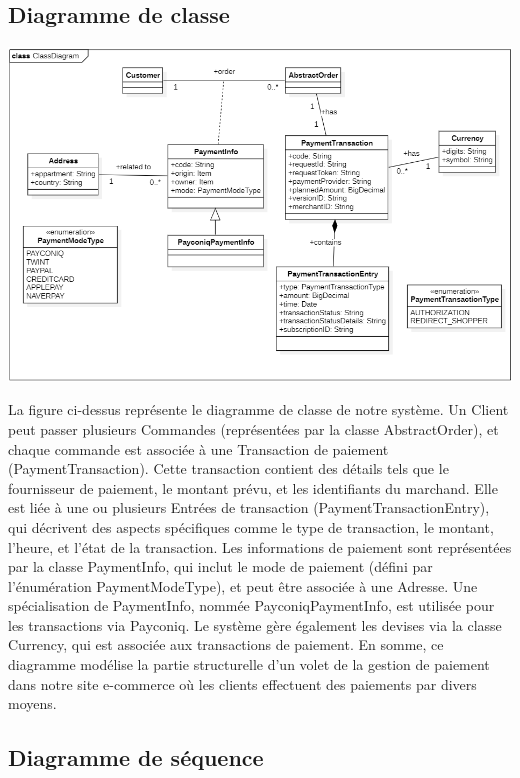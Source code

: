 \subsection{Diagramme de classe}
\begin{center}
    \centering
    \includegraphics[width=19cm]{Figures/class.png}
\end{center}

La figure ci-dessus représente le diagramme de classe de notre système. Un Client peut passer plusieurs Commandes (représentées par la classe AbstractOrder), et chaque commande est associée à une Transaction de paiement (PaymentTransaction). Cette transaction contient des détails tels que le fournisseur de paiement, le montant prévu, et les identifiants du marchand. Elle est liée à une ou plusieurs Entrées de transaction (PaymentTransactionEntry), qui décrivent des aspects spécifiques comme le type de transaction, le montant, l'heure, et l'état de la transaction. Les informations de paiement sont représentées par la classe PaymentInfo, qui inclut le mode de paiement (défini par l'énumération PaymentModeType), et peut être associée à une Adresse. Une spécialisation de PaymentInfo, nommée PayconiqPaymentInfo, est utilisée pour les transactions via Payconiq. Le système gère également les devises via la classe Currency, qui est associée aux transactions de paiement. En somme, ce diagramme modélise la partie structurelle d'un volet de la gestion de paiement dans notre site e-commerce où les clients effectuent des paiements par divers moyens.

\subsection{Diagramme de séquence}


